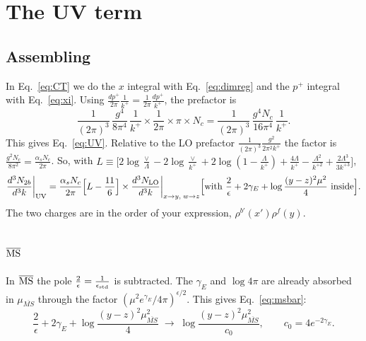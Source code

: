 \documentclass[10pt]{article}
\numberwithin{equation}{section}
\begin{document}
\section{The UV term}\label{sec:UVterm}
\subsection{Assembling}
In Eq.~\eqref{eq:CT} we do the $x$ integral with Eq.~\eqref{eq:dimreg} and the $p^+$ integral with Eq.~\eqref{eq:xi}. Using $\frac{dp^+}{2\pi}\frac{1}{k^+}=\frac{1}{2\pi}\frac{dp^+}{k^+}$, the prefactor is
\begin{equation}
\frac{1}{(2\pi)^3}\,\frac{g^4}{8\pi^4}\,\frac1{k^+}\times\frac{1}{2\pi}\times\pi\times N_c=\frac{1}{(2\pi)^3}\,\frac{g^4N_c}{16\pi^4}\,\frac{1}{k^+}.
\end{equation}
This gives Eq.~\eqref{eq:UV}. Relative to the LO prefactor $\frac{1}{(2\pi)^3}\frac{g^2}{2\pi^2k^+}$ the factor is $\frac{g^2N_c}{8\pi^2}=\frac{\alpha_sN_c}{2\pi}$. So, with $L\equiv\big[2\log\frac\vee\Lambda-2\log\frac\vee{k^+}+2\log(1-\frac\Lambda{k^+})+\frac{4\Lambda}{k^+}-\frac{\Lambda^2}{k^{+2}}+\frac{2\Lambda^3}{3k^{+3}}\big]$,
\begin{equation}
\frac{d^{3}N_{2b}}{d^{3}k}\bigg|_{\rm UV}=\frac{\alpha_sN_c}{2\pi}\Big[L-\frac{11}{6}\Big]\times\frac{d^3N_{\rm LO}}{d^3k}\bigg|_{x\to y,\;w\to z}\Big[\text{with }\frac2\epsilon+2\gamma_E+\log\frac{(y-z)^2\mu^2}{4}\text{ inside}\Big].
\end{equation}
The two charges are in the order of your expression, $\rho^{b'}(x')\rho^f(y)$.

\subsection{\texorpdfstring{$\overline{\rm MS}$}{MS-bar}}
In $\overline{\rm MS}$ the pole $\frac2\epsilon=\frac1{\epsilon_{\rm std}}$ is subtracted. The $\gamma_E$ and $\log4\pi$ are already absorbed in $\mu_{\overline{MS}}$ through the factor $(\mu^2e^{\gamma_E}/4\pi)^{\epsilon/2}$. This gives Eq.~\eqref{eq:msbar}:
\begin{equation}
\frac{2}{\epsilon}+2\gamma_{E}+\log\frac{(y-z)^{2}\mu^{2}_{\overline{MS}}}{4}\;\to\;\log\frac{(y-z)^{2}\mu^{2}_{\overline{MS}}}{c_0},\qquad c_0=4e^{-2\gamma_E}.
\end{equation}
\end{document}
